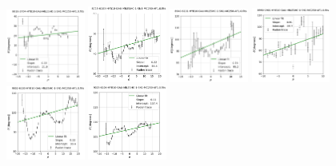\documentclass[fleqn,usenatbib]{mnras}
\begin{document}
\begin{figure}
    \centering
    \includegraphics[width=0.23\textwidth]{Images/LINFITS/CC1-8616-3704-LINFIT-EBARS-MASKED.png}
    \includegraphics[width=0.23\textwidth]{Images/LINFITS/CC1-8715-6103-LINFIT-EBARS-MASKED.png}
    \includegraphics[width=0.23\textwidth]{Images/LINFITS/CC1-8940-6101-LINFIT-EBARS-MASKED.png}
    \includegraphics[width=0.23\textwidth]{Images/LINFITS/CC1-8990-1901-LINFIT-EBARS-MASKED.png}
    \includegraphics[width=0.23\textwidth]{Images/LINFITS/CC1-9002-6103-LINFIT-EBARS-MASKED.png}
    \includegraphics[width=0.23\textwidth]{Images/LINFITS/CC1-9025-6104-LINFIT-EBARS-MASKED.png}

\end{figure}
\end{document}
